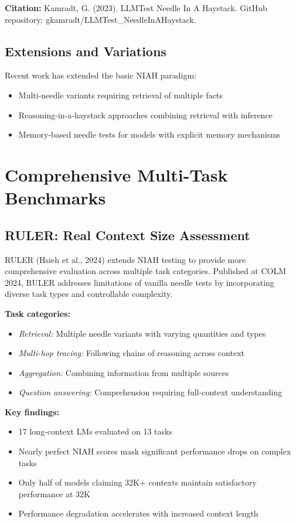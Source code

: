\documentclass[11pt]{article}
\begin{document}
\textbf{Citation:} Kamradt, G. (2023). LLMTest Needle In A Haystack. GitHub repository: gkamradt/LLMTest\_NeedleInAHaystack.

\subsection{Extensions and Variations}

Recent work has extended the basic NIAH paradigm:
\begin{itemize}[leftmargin=*]
    \item Multi-needle variants requiring retrieval of multiple facts
    \item Reasoning-in-a-haystack approaches combining retrieval with inference
    \item Memory-based needle tests for models with explicit memory mechanisms
\end{itemize}

\section{Comprehensive Multi-Task Benchmarks}

\subsection{RULER: Real Context Size Assessment}

RULER (Hsieh et al., 2024) extends NIAH testing to provide more comprehensive evaluation across multiple task categories. Published at COLM 2024, RULER addresses limitations of vanilla needle tests by incorporating diverse task types and controllable complexity.

\textbf{Task categories:}
\begin{itemize}[leftmargin=*]
    \item \textit{Retrieval:} Multiple needle variants with varying quantities and types
    \item \textit{Multi-hop tracing:} Following chains of reasoning across context
    \item \textit{Aggregation:} Combining information from multiple sources
    \item \textit{Question answering:} Comprehension requiring full-context understanding
\end{itemize}

\textbf{Key findings:}
\begin{itemize}[leftmargin=*]
    \item 17 long-context LMs evaluated on 13 tasks
    \item Nearly perfect NIAH scores mask significant performance drops on complex tasks
    \item Only half of models claiming 32K+ contexts maintain satisfactory performance at 32K
    \item Performance degradation accelerates with increased context length
\end{itemize}
\end{document}
